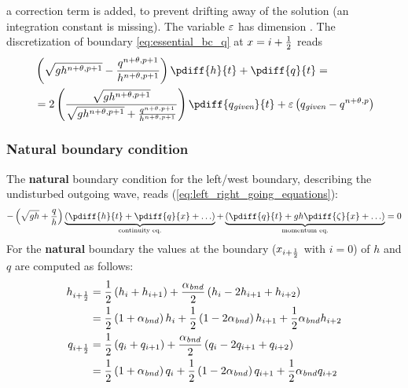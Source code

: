 a correction term is added, to prevent drifting away of the solution (an integration constant is missing).
The variable $\varepsilon$ has dimension \bunit{\per\second}.
The discretization of  boundary \autoref{eq:essential_bc_q} at $x=i+\frac{1}{2}$ reads
\begin{align}
    &\left(\sqrt{gh^{n+\theta,p+1}} - \frac{q^{n+\theta,p+1}}{h^{n+\theta,p+1}} \right) \pdiff{h}{t} + \pdiff{q}{t} =
    \nonumber \\*
    & = 2 \left(  \frac{\sqrt{gh^{n+\theta,p+1}}}{\sqrt{gh^{n+\theta,p+1}} + \frac{q^{n+\theta,p+1}}{h^{n+\theta,p+1}}} \right) \pdiff{q_{\textit{given}}}{t} + \eps \left( q_{\textit{given}} - q^{n+\theta,p}   \right)
\end{align}

\subsubsection{Natural boundary condition}

The \textbf{natural} boundary condition for the left/west boundary, describing the undisturbed outgoing wave, reads (\autoref{eq:left_right_going_equations}):
\begin{align}
- \left(\sqrt{gh} + \frac{q}{h}\right) \underbrace{ \left(\pdiff{h}{t} + \pdiff{q}{x} + \ldots \right) }_{\text{continuity eq.}} + \underbrace{\left(\pdiff{q}{t} + g h \pdiff{\zeta}{x}+\ldots\right)}_{\text{momentum eq.}} = 0
\end{align}
For the \textbf{natural} boundary the values at the boundary ($x_{i+\frac{1}{2}}$ with $i=0$) of $h$ and $q$ are computed as follows:
%
\begin{align}
    h_{i+\frac{1}{2}} & = \frac{1}{2} \left( h_{i} +  h_{i+1} \right) +
    \frac{\alpha_{\it bnd}}{2} \left( h_{i}
    - 2 h_{i+1} + h_{i+2} \right)
    \nonumber \\*
    & = \frac{1}{2} \left( 1 + \alpha_{\it bnd} \right) h_{i} +
    \frac{1}{2} \left( 1 - 2\alpha_{\it bnd} \right) h_{i+1} +
    \frac{1}{2} \alpha_{\it bnd} h_{i+2}\label{eq:h_at_left_boundary}
    \\
    q_{i+\frac{1}{2}} & =  \frac{1}{2} \left( q_{i} + q_{i+1}\right)
    + \frac{\alpha_{\it bnd}}{2} \left( q_{i}
    - 2 q_{i+1} + q_{i+2} \right)
    \nonumber \\*
    & = \frac{1}{2} \left( 1 + \alpha_{\it bnd} \right) q_{i} +
    \frac{1}{2} \left( 1 - 2\alpha_{\it bnd} \right) q_{i+1} +
    \frac{1}{2} \alpha_{\it bnd} q_{i+2}\label{eq:q_at_left_boundary}
\end{align}

